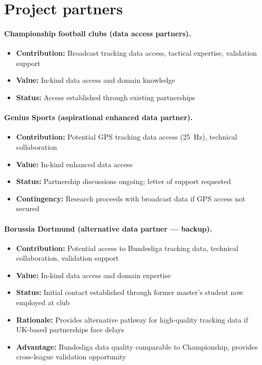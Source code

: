 \section{Project partners}

\paragraph{Championship football clubs (data access partners).}
\begin{itemize}
  \item \textbf{Contribution:} Broadcast tracking data access, tactical expertise, validation support
  \item \textbf{Value:} In-kind data access and domain knowledge
  \item \textbf{Status:} Access established through existing partnerships
\end{itemize}

\paragraph{Genius Sports (aspirational enhanced data partner).}
\begin{itemize}
  \item \textbf{Contribution:} Potential GPS tracking data access (25~Hz), technical collaboration
  \item \textbf{Value:} In-kind enhanced data access
  \item \textbf{Status:} Partnership discussions ongoing; letter of support requested
  \item \textbf{Contingency:} Research proceeds with broadcast data if GPS access not secured
\end{itemize}

\paragraph{Borussia Dortmund (alternative data partner --- backup).}
\begin{itemize}
  \item \textbf{Contribution:} Potential access to Bundesliga tracking data, technical collaboration, validation support
  \item \textbf{Value:} In-kind data access and domain expertise
  \item \textbf{Status:} Initial contact established through former master's student now employed at club
  \item \textbf{Rationale:} Provides alternative pathway for high-quality tracking data if UK-based partnerships face delays
  \item \textbf{Advantage:} Bundesliga data quality comparable to Championship, provides cross-league validation opportunity
\end{itemize}
